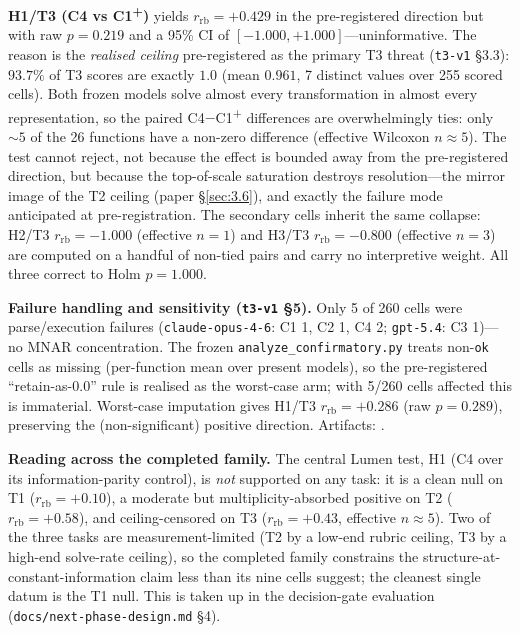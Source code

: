 \documentclass[11pt]{article}
\begin{document}
\textbf{H1/T3 (C4 vs C1\textsuperscript{+})} yields $r_{\text{rb}} =
+0.429$ in the pre-registered direction but with raw $p = 0.219$ and a 95\%
CI of $[-1.000, +1.000]$---uninformative. The reason is the
\emph{realised ceiling} pre-registered as the primary T3 threat
(\texttt{t3-v1} \S3.3): $93.7\%$ of T3 scores are exactly $1.0$ (mean
$0.961$, 7 distinct values over 255 scored cells). Both frozen models solve
almost every transformation in almost every representation, so the paired
C4$-$C1\textsuperscript{+} differences are overwhelmingly ties: only $\sim
5$ of the 26 functions have a non-zero difference (effective Wilcoxon $n
\approx 5$). The test cannot reject, not because the effect is bounded away
from the pre-registered direction, but because the top-of-scale saturation
destroys resolution---the mirror image of the T2 ceiling (paper
\S\ref{sec:3.6}), and exactly the failure mode anticipated at
pre-registration. The secondary cells inherit the same collapse: H2/T3
$r_{\text{rb}} = -1.000$ (effective $n = 1$) and H3/T3 $r_{\text{rb}} =
-0.800$ (effective $n = 3$) are computed on a handful of non-tied pairs and
carry no interpretive weight. All three correct to Holm $p = 1.000$.

\textbf{Failure handling and sensitivity (\texttt{t3-v1} \S5).} Only 5 of
260 cells were parse/execution failures (\texttt{claude-opus-4-6}: C1 1,
C2 1, C4 2; \texttt{gpt-5.4}: C3 1)---no MNAR concentration. The frozen
\texttt{analyze\_confirmatory.py} treats non-\texttt{ok} cells as missing
(per-function mean over present models), so the pre-registered
``retain-as-0.0'' rule is realised as the worst-case arm; with 5/260 cells
affected this is immaterial. Worst-case imputation gives H1/T3
$r_{\text{rb}} = +0.286$ (raw $p = 0.289$), preserving the (non-significant)
positive direction. Artifacts:
.

\textbf{Reading across the completed family.} The central Lumen test, H1
(C4 over its information-parity control), is \emph{not} supported on any
task: it is a clean null on T1 ($r_{\text{rb}} = +0.10$), a moderate but
multiplicity-absorbed positive on T2 ($r_{\text{rb}} = +0.58$), and
ceiling-censored on T3 ($r_{\text{rb}} = +0.43$, effective $n \approx 5$).
Two of the three tasks are measurement-limited (T2 by a low-end rubric
ceiling, T3 by a high-end solve-rate ceiling), so the completed family
constrains the structure-at-constant-information claim less than its nine
cells suggest; the cleanest single datum is the T1 null. This is taken up
in the decision-gate evaluation (\texttt{docs/next-phase-design.md} \S4).
\end{document}
